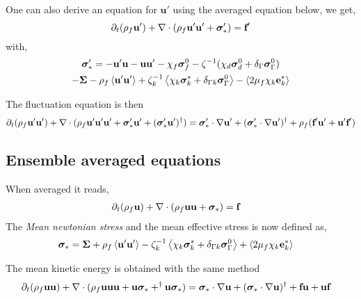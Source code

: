 One can also derive an equation for $\textbf{u}'$ using the averaged equation below, we get,
\begin{equation}
    \partial_t(\rho_f\textbf{u}') + \mathbf{\nabla}\cdot (\rho_f \textbf{u}'\textbf{u}' + \bm\sigma'_*)
    = \textbf{f}'
\end{equation}
with,
\begin{multline}
    \bm\sigma_*' = 
    - \textbf{u}' \textbf{u}
    - \textbf{u} \textbf{u}' 
    - \chi_f \bm\sigma_f^0  
    - \zeta^{-1} (\chi_d \bm\sigma_d^0 + \delta_{\Gamma} \bm\sigma_{\Gamma}^0)  \\
    - \bm\Sigma
    - \rho_f \left<\textbf{u}'\textbf{u}'\right>
    + \zeta_k^{-1} \left<\chi_k \bm\sigma_k^* + \delta_{\Gamma k} \bm\sigma_\Gamma^0\right> 
    - \left<2\mu_f \chi_k \textbf{e}_k^*\right>
\end{multline}

The fluctuation equation is then 
\begin{multline}
    \partial_t(\rho_f\textbf{u}'\textbf{u}') + \mathbf{\nabla}\cdot (\rho_f \textbf{u}'\textbf{u}'\textbf{u}' + \bm\sigma'_*\textbf{u}' + (\bm\sigma_*' \textbf{u}' )^\dagger )
    = 
    \bm\sigma_*' \cdot \mathbf{\nabla} \textbf{u}'
    +(\bm\sigma_*' \cdot \mathbf{\nabla} \textbf{u}')^\dagger
    + \rho_f (\textbf{f}' \textbf{u}' + \textbf{u}' \textbf{f}')
\end{multline}

\subsection{Ensemble averaged equations}
When averaged it reads, 
\begin{align*}
    \partial_t(\rho_f\textbf{u}) + \mathbf{\nabla}\cdot (\rho_f \textbf{u}\textbf{u} + \bm\sigma_*)
    &= 
    \textbf{f}
\end{align*}
The \textit{Mean newtonian stress} and the mean effective stress is now defined as, 
\begin{align}
    \bm\sigma_* &= 
    \bm\Sigma
    + \rho_f \left<\textbf{u}'\textbf{u}'\right>
    - \zeta_k^{-1} \left<\chi_k \bm\sigma_k^* + \delta_{\Gamma k} \bm\sigma_\Gamma^0\right> 
    + \left<2\mu_f \chi_k \textbf{e}_k^*\right>
\end{align}

The mean kinetic energy is obtained with the same method 
\begin{align*}
    \partial_t(\rho_f\textbf{uu}) + \mathbf{\nabla}\cdot (\rho_f \textbf{u}\textbf{uu} + \textbf{u}\bm\sigma_* + ^\dagger\textbf{u}\bm\sigma_* )
    &= 
    \bm\sigma_*\cdot \mathbf{\nabla} \textbf{u}
    + (\bm\sigma_*\cdot \mathbf{\nabla} \textbf{u})^\dagger
    + \textbf{fu}
    + \textbf{uf}
\end{align*}

